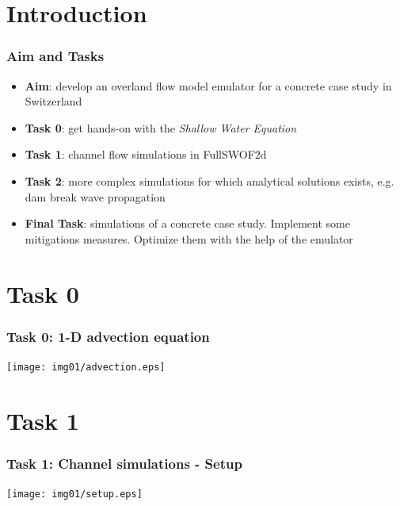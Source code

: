 \documentclass[xcolor=dvipsnames, USenglish]{beamer}  %
\begin{document}
\section{Introduction}

  \begin{frame}
    \frametitle{Aim and Tasks}
    \begin{itemize}
      \item \textbf{Aim}: develop an overland flow model emulator for a concrete case study in Switzerland
      \item \textbf{Task 0}: get hands-on with the \emph{Shallow Water Equation}
      \item \textbf{Task 1}: channel flow simulations in FullSWOF2d
      \item \textbf{Task 2}: more complex simulations for which analytical
        solutions exists, e.g. dam break wave propagation
      \item \textbf{Final Task}: simulations of a concrete case study. Implement
        some mitigations measures. Optimize them with the help of the emulator
     \end{itemize}
  \end{frame}


\section{Task 0}

  \begin{frame}
    \frametitle{Task 0: 1-D advection equation}
    \centering
    \texttt{[image: img01/advection.eps]}
  \end{frame}


\section{Task 1}

  \begin{frame}
    \frametitle{Task 1: Channel simulations - Setup}
    \centering
    \texttt{[image: img01/setup.eps]}
  \end{frame}
\end{document}
